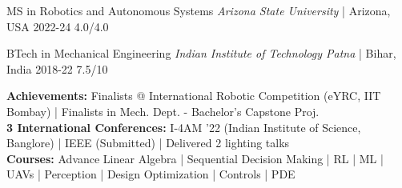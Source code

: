 



\begin{cvhonors}

  \cvhonor
    {\normalsize MS in Robotics and Autonomous Systems} %
    {\textit{Arizona State University} | Arizona, USA} %
    {2022-24} %
    {4.0/4.0} %

  \cvhonor
    {\normalsize BTech in Mechanical Engineering} %
    {\textit{Indian Institute of Technology Patna} | Bihar, India} %
    {2018-22} %
    {7.5/10} %


\end{cvhonors}



\begin{cvparagraph}
{\normalsize\textbf{Achievements:} Finalists @ International Robotic Competition (eYRC, IIT Bombay) | Finalists in Mech. Dept. - Bachelor's Capstone Proj. \\}
{\normalsize\textbf{3 International Conferences:}  I-4AM '22 (Indian Institute of Science, Banglore) | IEEE (Submitted) |  Delivered 2 lighting talks\\}
{\normalsize\textbf{Courses:} Advance Linear Algebra | Sequential Decision Making | RL | ML | UAVs | Perception | Design Optimization | Controls | PDE\\}
\end{cvparagraph}




    
